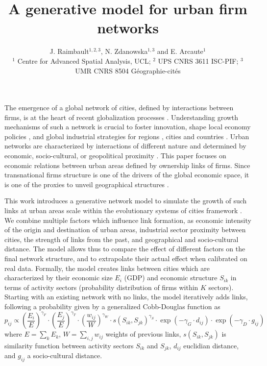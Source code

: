 \documentclass[10pt,letterpaper]{article}
\title{\vspace{-2.5cm}A generative model for urban firm networks}
\author{J. Raimbault$^{1,2,3}$, N. Zdanowska$^{1,3}$ and E. Arcaute$^1$\\\medskip\small
$^{1}$ Centre for Advanced Spatial Analysis, UCL; $^{2}$ UPS CNRS 3611 ISC-PIF; $^{3}$ UMR CNRS 8504 G{\'e}ographie-cit{\'e}s
}
\date{}
\begin{document}
\maketitle

\vspace{-0.5cm}

The emergence of a global network of cities, defined by interactions between firms, is at the heart of recent globalization processes \cite{taylor2001specification}. Understanding growth mechanisms of such a network is crucial to foster innovation, shape local economy policies \cite{turkina2016structure}, and global industrial strategies for regions \cite{dawley2019creating}, cities \cite{gluckler2016relational} and countries \cite{martinus2019brokerage}. Urban networks are characterized by interactions of different nature and determined by economic, socio-cultural, or geopolitical proximity \cite{martinus2018global}. This paper focuses on economic relations between urban areas defined by ownership links of firms. Since transnational firms structure is one of the drivers of the global economic space, it is one of the proxies to unveil geographical structures \cite{2019arXiv191014652Z}. 

This work introduces a generative network model to simulate the growth of such links at urban areas scale within the evolutionary systems of cities framework \cite{pumain2018evolutionary}. We combine multiple factors which influence link formation, as economic intensity of the origin and destination of urban areas, industrial sector proximity between cities, the strength of links from the past, and geographical and socio-cultural distance. The model allows thus to compare the effect of different factors on the final network structure, and to extrapolate their actual effect when calibrated on real data. Formally, the model creates links between cities which are characterized by their economic size $E_i$ (GDP) and economic structure $S_{ik}$ in terms of activity sectors (probability distribution of firms within $K$ sectors). Starting with an existing network with no links, the model iteratively adds links, following a probability given by a generalized Cobb-Douglas function \cite{vilcu2011geometric} as 
\[
p_{ij} \propto \left(\frac{E_{i}}{E}\right)^{\gamma_F} \cdot \left(\frac{E_{j}}{E}\right)^{\gamma_T} \cdot \left(\frac{w_{ij}}{W}\right)^{\gamma_W} \cdot s\left(S_{ik},S_{jk}\right)^{\gamma_S} \cdot \exp \left(- \gamma_G \cdot d_{ij}\right) \cdot \exp \left(- \gamma_D \cdot g_{ij}\right)
\]
where $E  =  \sum_k E_k$, $W  = \sum_{i,j} w_{ij}$ weights of previous links, $s(S_{ik},S_{jk})$ is similarity function between activity sectors $S_{ik}$ and $S_{jk}$, $d_{ij}$ euclidian distance, and $g_{ij}$ a socio-cultural distance.
\end{document}
